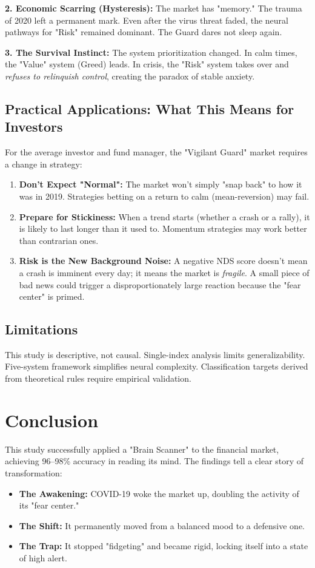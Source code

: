 \documentclass[conference]{IEEEtran}
\begin{document}
\textbf{2. Economic Scarring (Hysteresis):} The market has "memory." The trauma of 2020 left a permanent mark. Even after the virus threat faded, the neural pathways for "Risk" remained dominant. The Guard dares not sleep again.

\textbf{3. The Survival Instinct:} The system prioritization changed. In calm times, the "Value" system (Greed) leads. In crisis, the "Risk" system takes over and \textit{refuses to relinquish control}, creating the paradox of stable anxiety.

\subsection{Practical Applications: What This Means for Investors}

For the average investor and fund manager, the "Vigilant Guard" market requires a change in strategy:
\begin{enumerate}
    \item \textbf{Don't Expect "Normal":} The market won't simply "snap back" to how it was in 2019. Strategies betting on a return to calm (mean-reversion) may fail.
    \item \textbf{Prepare for Stickiness:} When a trend starts (whether a crash or a rally), it is likely to last longer than it used to. Momentum strategies may work better than contrarian ones.
    \item \textbf{Risk is the New Background Noise:} A negative NDS score doesn't mean a crash is imminent every day; it means the market is \textit{fragile}. A small piece of bad news could trigger a disproportionately large reaction because the "fear center" is primed.
\end{enumerate}

\subsection{Limitations}

This study is descriptive, not causal. Single-index analysis limits generalizability. Five-system framework simplifies neural complexity. Classification targets derived from theoretical rules require empirical validation.

\section{Conclusion}

This study successfully applied a "Brain Scanner" to the financial market, achieving 96--98\% accuracy in reading its mind.
The findings tell a clear story of transformation:
\begin{itemize}
    \item \textbf{The Awakening:} COVID-19 woke the market up, doubling the activity of its "fear center."
    \item \textbf{The Shift:} It permanently moved from a balanced mood to a defensive one.
    \item \textbf{The Trap:} It stopped "fidgeting" and became rigid, locking itself into a state of high alert.
\end{itemize}
\end{document}
